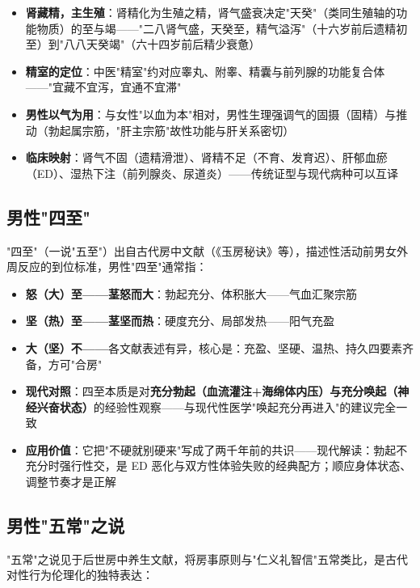 \begin{itemize}
	\item \textbf{肾藏精，主生殖}：肾精化为生殖之精，肾气盛衰决定"天癸"（类同生殖轴的功能物质）的至与竭——"二八肾气盛，天癸至，精气溢泻"（十六岁前后遗精初至）到"八八天癸竭"（六十四岁前后精少衰惫）
	\item \textbf{精室的定位}：中医"精室"约对应睾丸、附睾、精囊与前列腺的功能复合体——"宜藏不宜泻，宜通不宜滞"
	\item \textbf{男性以气为用}：与女性"以血为本"相对，男性生理强调气的固摄（固精）与推动（勃起属宗筋，"肝主宗筋"故性功能与肝关系密切）
	\item \textbf{临床映射}：肾气不固（遗精滑泄）、肾精不足（不育、发育迟）、肝郁血瘀（ED）、湿热下注（前列腺炎、尿道炎）——传统证型与现代病种可以互译
\end{itemize}

\subsection{男性"四至"}


"四至"（一说"五至"）出自古代房中文献（《玉房秘诀》等），描述性活动前男女外周反应的到位标准，男性"四至"通常指：

\begin{itemize}
	\item \textbf{怒（大）至——茎怒而大}：勃起充分、体积胀大——气血汇聚宗筋
	\item \textbf{坚（热）至——茎坚而热}：硬度充分、局部发热——阳气充盈
	\item \textbf{大（坚）不——}各文献表述有异，核心是：充盈、坚硬、温热、持久四要素齐备，方可"合房"
	\item \textbf{现代对照}：四至本质是对\textbf{充分勃起（血流灌注+海绵体内压）与充分唤起（神经兴奋状态）}的经验性观察——与现代性医学"唤起充分再进入"的建议完全一致
	\item \textbf{应用价值}：它把"不硬就别硬来"写成了两千年前的共识——现代解读：勃起不充分时强行性交，是 ED 恶化与双方性体验失败的经典配方；顺应身体状态、调整节奏才是正解
\end{itemize}

\subsection{男性"五常"之说}


"五常"之说见于后世房中养生文献，将房事原则与"仁义礼智信"五常类比，是古代对性行为伦理化的独特表达：


